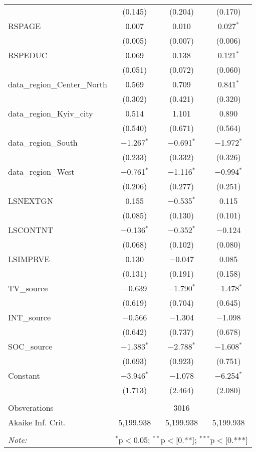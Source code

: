 \begin{table}[!htbp]
\begin{tabular}{@{\extracolsep{1pt}}lccc}
  & (0.145) & (0.204) & (0.170) \\ 
  RSPAGE & 0.007 & 0.010 & 0.027$^{*}$ \\ 
  & (0.005) & (0.007) & (0.006) \\ 
  RSPEDUC & 0.069 & 0.138 & 0.121$^{*}$ \\ 
  & (0.051) & (0.072) & (0.060) \\ 
  data\_region\_Center\_North & 0.569 & 0.709 & 0.841$^{*}$ \\ 
  & (0.302) & (0.421) & (0.320) \\ 
  data\_region\_Kyiv\_city & 0.514 & 1.101 & 0.890 \\ 
  & (0.540) & (0.671) & (0.564) \\ 
  data\_region\_South & $-$1.267$^{*}$ & $-$0.691$^{*}$ & $-$1.972$^{*}$ \\ 
  & (0.233) & (0.332) & (0.326) \\ 
  data\_region\_West & $-$0.761$^{*}$ & $-$1.116$^{*}$ & $-$0.994$^{*}$ \\ 
  & (0.206) & (0.277) & (0.251) \\ 
  LSNEXTGN & 0.155 & $-$0.535$^{*}$ & 0.115 \\ 
  & (0.085) & (0.130) & (0.101) \\ 
  LSCONTNT & $-$0.136$^{*}$ & $-$0.352$^{*}$ & $-$0.124 \\ 
  & (0.068) & (0.102) & (0.080) \\ 
  LSIMPRVE & 0.130 & $-$0.047 & 0.085 \\ 
  & (0.131) & (0.191) & (0.158) \\ 
  TV\_source & $-$0.639 & $-$1.790$^{*}$ & $-$1.478$^{*}$ \\ 
  & (0.619) & (0.704) & (0.645) \\ 
  INT\_source & $-$0.566 & $-$1.304 & $-$1.098 \\ 
  & (0.642) & (0.737) & (0.678) \\ 
  SOC\_source & $-$1.383$^{*}$ & $-$2.788$^{*}$ & $-$1.608$^{*}$ \\ 
  & (0.693) & (0.923) & (0.751) \\ 
  Constant & $-$3.946$^{*}$ & $-$1.078 & $-$6.254$^{*}$ \\ 
  & (1.713) & (2.464) & (2.080) \\ 
 \hline \\[-1.8ex] 
Obsverations &  & 3016 &  \\ 
Akaike Inf. Crit. & 5,199.938 & 5,199.938 & 5,199.938 \\ 
\hline 
\hline \\[-1.8ex] 
\textit{Note:}  & \multicolumn{3}{r}{$^{*}$p$<$0.05; $^{**}$p$<$[0.**]; $^{***}$p$<$[0.***]} \\ 
\end{tabular} 
\end{table} 
